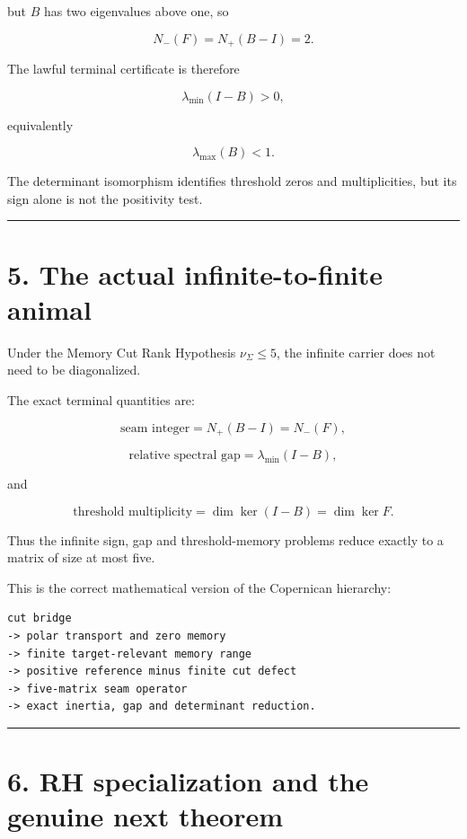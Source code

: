 but \(B\) has two eigenvalues above one, so

\[
N_-(F)=N_+(B-I)=2.
\]

The lawful terminal certificate is therefore

\[
\boxed{
\lambda_{\min}(I-B)>0,
}
\]

equivalently

\[
\boxed{
\lambda_{\max}(B)<1.
}
\]

The determinant isomorphism identifies threshold zeros and multiplicities, but
its sign alone is not the positivity test.

\begin{center}\rule{0.5\linewidth}{0.5pt}\end{center}

\hypertarget{the-actual-infinite-to-finite-animal}{%
\section{5. The actual infinite-to-finite animal}\label{the-actual-infinite-to-finite-animal}}

Under the Memory Cut Rank Hypothesis \(\nu_\Sigma\le5\), the infinite carrier
does not need to be diagonalized.

The exact terminal quantities are:

\[
\boxed{
\text{seam integer}
=
N_+(B-I)
=
N_-(F),
}
\]

\[
\boxed{
\text{relative spectral gap}
=
\lambda_{\min}(I-B),
}
\]

and

\[
\boxed{
\text{threshold multiplicity}
=
\dim\ker(I-B)
=
\dim\ker F.
}
\]

Thus the infinite sign, gap and threshold-memory problems reduce exactly to a
matrix of size at most five.

This is the correct mathematical version of the Copernican hierarchy:

\begin{verbatim}
cut bridge
-> polar transport and zero memory
-> finite target-relevant memory range
-> positive reference minus finite cut defect
-> five-matrix seam operator
-> exact inertia, gap and determinant reduction.
\end{verbatim}

\begin{center}\rule{0.5\linewidth}{0.5pt}\end{center}

\hypertarget{rh-specialization-and-the-genuine-next-theorem}{%
\section{6. RH specialization and the genuine next theorem}\label{rh-specialization-and-the-genuine-next-theorem}}

